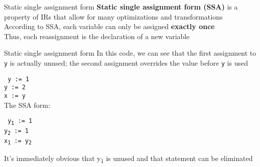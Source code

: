 \documentclass[../index.tex]{subfiles}
\begin{document}
\renewcommand{\currenttitle}{Static single assignment form}
\begin{frame}[fragile]{\currenttitle}
  \textbf{Static single assignment form (SSA)} is a property of IRs that allow
  for many optimizations and transformations \\[1.5em]

  According to SSA, each variable can only be assigned \textbf{exactly once} \\
  Thus, each reassignment is the declaration of a new variable
\end{frame}
  
\begin{frame}[fragile]{\currenttitle}
  In this code, we can see that the first assignment to \texttt{y} is actually
  unused; the second assignment overrides the value before \texttt{y} is used

  \texttt{%
    y := 1 \\
    y := 2 \\
    x := y
  } \\[1em]

  The SSA form:

  \texttt{%
    y\textsubscript{1} := 1 \\
    y\textsubscript{2} := 1 \\
    x\textsubscript{1} := y\textsubscript{2}
  }

  It's immediately obvious that y\textsubscript{1} is unused and that statement
  can be eliminated
\end{frame}
  
\end{document}
